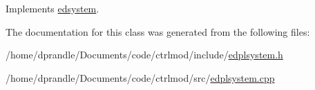 Implements \hyperlink{classedsystem_afd5308dc71350fe4e239cac5fb1bdbe9}{edsystem}.



The documentation for this class was generated from the following files\-:\begin{DoxyCompactItemize}
\item 
/home/dprandle/\-Documents/code/ctrlmod/include/\hyperlink{edplsystem_8h}{edplsystem.\-h}\item 
/home/dprandle/\-Documents/code/ctrlmod/src/\hyperlink{edplsystem_8cpp}{edplsystem.\-cpp}\end{DoxyCompactItemize}
